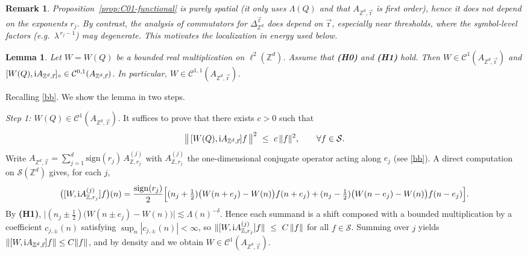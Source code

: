 \documentclass[10pt]{amsart} %
\newcommand{\Z}{{\mathbb{Z}}}
\newcommand{\1}{{\mathbb{I}}}
\newcommand{\Cc}{\mathcal{C}}
\newcommand{\Sc}{\mathcal{S}}
\numberwithin{equation}{section}
\def\rmi{{\rm i}}
\newtheorem{lemma}[theorem]{Lemma}%
\newtheorem{remark}[theorem]{Remark}%
\begin{document}
\begin{remark}\label{rem:negative-rj}
Proposition~\ref{prop:C01-functional} is purely spatial (it only uses $\Lambda(Q)$ and that $A_{\mathbb{Z}^d,\vec{\mathrm{r}}}$ is first order), hence it does not depend on the exponents $r_j$.
By contrast, the analysis of commutators for $\Delta_{\mathbb{Z}^d}^{\vec{\mathrm{r}}}$ does depend on $\vec{\mathrm{r}}$, especially near thresholds, where the symbol-level factors (e.g.\ $\lambda^{\,r_j-1}$) may degenerate. This motivates the localization in energy used below.
\end{remark}

\begin{lemma}\label{lem:W-C11-weighted}
Let $W=W(Q)$ be a bounded real multiplication on $\ell^2(\mathbb{Z}^d)$.
Assume that \textbf{(H0)} and \textbf{(H1)} hold. Then $W\in \Cc^{1}(A_{\mathbb{Z}^d,\vec{\mathrm r}})$ and
$[W(Q),\rmi A_{\mathbb{Z}^d,\vec{\mathrm r}}]_{\circ}\in \Cc^{0,1}(A_{\mathbb{Z}^d,\vec{\mathrm r}})$.
In particular, $W\in \Cc^{1,1}(A_{\mathbb{Z}^d,\vec{\mathrm r}})$.
\end{lemma}

\proof
Recalling \eqref{bb}. We show the lemma in two steps.

\emph{Step 1: $W(Q)\in \Cc^{1}(A_{\Z^d,\vec{\mathrm r}})$.}
It suffices to prove that there exists $c>0$ such that
\[
\big\|\,[W(Q),\rmi A_{\Z^d,\vec{\mathrm r}}]f\,\big\|^2\ \le\ c\,\|f\|^2,\qquad \forall f\in\Sc.
\]
Write $A_{\Z^d,\vec{\mathrm r}}=\sum_{j=1}^d \mathrm{sign}(r_j)\,A_{\Z,r_j}^{(j)}$ with $A_{\Z,r_j}^{(j)}$
the one-dimensional conjugate operator acting along $e_j$ (see \eqref{bb}).
A direct computation on $\Sc(\Z^d)$ gives, for each $j$,
\[
\big([W,\rmi A_{\Z,r_j}^{(j)}] f\big)(n)
=\frac{\mathrm{sign}(r_j)}{2}\Big[(n_j+\tfrac12)\big(W(n+e_j)-W(n)\big)f(n+e_j)
+(n_j-\tfrac12)\big(W(n-e_j)-W(n)\big)f(n-e_j)\Big].
\]
By \textbf{(H1)},
\(
\big|(n_j\pm\tfrac12)\big(W(n\pm e_j)-W(n)\big)\big|
\lesssim \Lambda(n)^{-\delta}.
\)
Hence each summand is a shift composed with a bounded multiplication by a coefficient
$c_{j,\pm}(n)$ satisfying $\sup_n |c_{j,\pm}(n)|<\infty$, so
\(
\|[W,\rmi A_{\Z,r_j}^{(j)}]f\|\ \le\ C\,\|f\|
\)
for all $f\in\Sc$. Summing over $j$ yields
\(
\|[W,\rmi A_{\Z^d,\vec{\mathrm r}}]f\|\le C\|f\|
\),
and by density and \cite[Lemma~6.2.9]{ABG} we obtain $W\in \Cc^{1}(A_{\Z^d,\vec{\mathrm r}})$.
\end{document}
